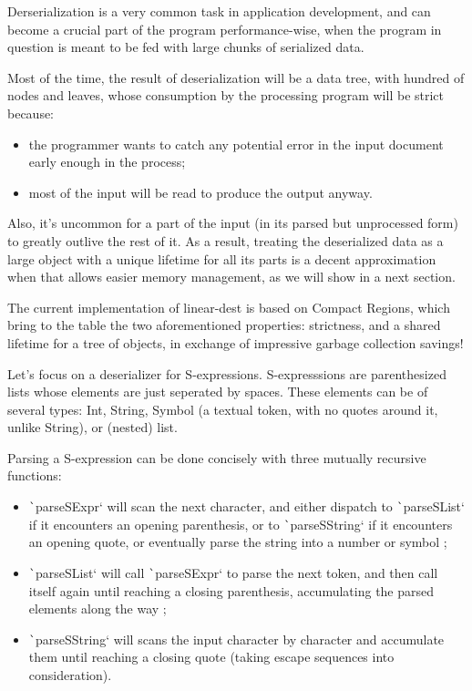 \documentclass[english]{jflart}
\begin{document}
Derserialization is a very common task in application development, and can become a crucial part of the program performance-wise, when the program in question is meant to be fed with large chunks of serialized data.

Most of the time, the result of deserialization will be a data tree, with hundred of nodes and leaves, whose consumption by the processing program will be strict because:
\begin{itemize}
  \item the programmer wants to catch any potential error in the input document early enough in the process;
  \item most of the input will be read to produce the output anyway.
\end{itemize}

Also, it's uncommon for a part of the input (in its parsed but unprocessed form) to greatly outlive the rest of it. As a result, treating the deserialized data as a large object with a unique lifetime for all its parts is a decent  approximation when that allows easier memory management, as we will show in a next section.

The current implementation of linear-dest is based on Compact Regions, which bring to the table the two aforementioned properties: strictness, and a shared lifetime for a tree of objects, in exchange of impressive garbage collection savings!

Let's focus on a deserializer for S-expressions. S-expresssions are parenthesized lists whose elements are just seperated by spaces. These elements can be of several types: Int, String, Symbol (a textual token, with no quotes around it, unlike String), or (nested) list.

Parsing a S-expression can be done concisely with three mutually recursive functions:
\begin{itemize}
  \item \texttt`parseSExpr` will scan the next character, and either dispatch to \texttt`parseSList` if it encounters an opening parenthesis, or to \texttt`parseSString` if it encounters an opening quote, or eventually parse the string into a number or symbol ;
  \item \texttt`parseSList` will call \texttt`parseSExpr` to parse the next token, and then call itself again until reaching a closing parenthesis, accumulating the parsed elements along the way ;
  \item \texttt`parseSString` will scans the input character by character and accumulate them until reaching a closing quote (taking escape sequences into consideration).
\end{itemize}
\end{document}
